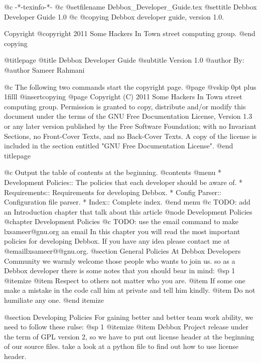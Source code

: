    @c -*-texinfo-*-
@c %
@setfilename Debbox_Developer_Guide.tex
@settitle Debbox Developer Guide 1.0
@c %
@copying
Debbox developer guide, version 1.0.

Copyright @copyright{} 2011 Some Hackers In Town street computing group.
@end copying

@titlepage
@title Debbox Developer Guide
@subtitle Version 1.0
@author By:
@author Sameer Rahmani

@c The following two commands start the copyright page.
@page
@vskip 0pt plus 1filll
@insertcopying
@page
Copyright (C)  2011  Some Hackers In Town street computing group.
Permission is granted to copy, distribute and/or modify this document
under the terms of the GNU Free Documentation License, Version 1.3
or any later version published by the Free Software Foundation;
with no Invariant Sections, no Front-Cover Texts, and no Back-Cover Texts.
A copy of the license is included in the section entitled "GNU
Free Documentation License".
@end titlepage

@c Output the table of contents at the beginning.
@contents
@menu
* Development Policies::        The policies that each developer should be aware of.
* Requirements::        Requirements for developing Debbox.
* Config Parser::       Configuration file parser.
* Index::            Complete index.
@end menu
@c TODO: add an Introduction chapter that talk about this article
@node Development Policies
@chapter Development Policies
@c TODO: use the email command to make lxsameer@gnu.org an email
In this chapter you will read the most important policies for developing Debbox. If you have any idea please contact me at @email{lxsameer@@gnu.org}.
@section General Policies    
At Debbox Developers Community we warmly welcome those people who wants to join us. so
as a Debbox developer there is some notes that you should bear in mind:
@sp 1
@itemize
@item
Respect to others not matter who you are.
@item
If some one make a mistake in the code call him at private and tell him kindly.
@item
Do not humiliate any one.
@end itemize

@section Developing Policies
For gaining better and better team work ability, we need to follow these rulse:
@sp 1
@itemize
@item
Debbox Project release under the term of GPL version 2, so we have to put out license
header at the beginning of our source files. take a look at a python file to find out how to use 
license header.


